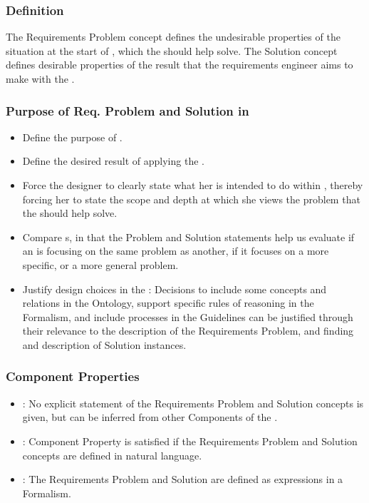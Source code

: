 \documentclass[10pt, final, conference, compsocconf]{IEEEtran}
\begin{document}
\subsubsection{Definition} The Requirements Problem concept defines the undesirable properties of the situation at the start of , which the  should help solve. The Solution concept defines desirable properties of the result that the requirements engineer aims to make with the .

\subsubsection{Purpose of Req. Problem and Solution in }
\begin{itemize}
\item{Define the purpose of .}
\item{Define the desired result of applying the .}
\item{Force the  designer to clearly state what her  is intended to do within , thereby forcing her to state the scope and depth at which she views the problem that the  should help solve.}
\item{Compare s, in that the Problem and Solution statements help us evaluate if an  is focusing on the same problem as another, if it focuses on a more specific, or a more general problem.}
\item{Justify design choices in the : Decisions to include some concepts and relations in the Ontology, support specific rules of reasoning in the Formalism, and include processes in the Guidelines can be justified through their relevance to the description of the Requirements Problem, and finding and description of Solution instances.}
\end{itemize}

\subsubsection{Component Properties}
\begin{itemize}
\item{: No explicit statement of the Requirements Problem and Solution concepts is given, but can be inferred from other Components of the .}
\item{: Component Property is satisfied if the Requirements Problem and Solution concepts are defined in natural language.}
\item{: The Requirements Problem and Solution are defined as expressions in a Formalism.}
\end{itemize}
\end{document}
